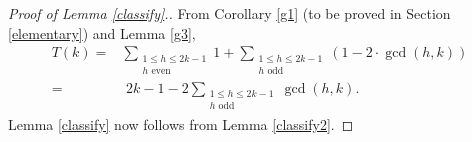 \documentclass[11pt,reqno]{amsart}
\theoremstyle{plain}
\numberwithin{equation}{section}
\begin{document}
\begin{proof}[Proof of Lemma \ref{classify}.] From Corollary \ref{g1} (to be proved in Section \ref{elementary}) and Lemma \ref{g3},
\begin{align*}
T(k) =&\sum\limits_{\substack{1\leq h \leq 2k - 1 \\ h \text{ even}}}  1 + \sum\limits_{\substack{1\leq h \leq 2k - 1 \\ h \text{ odd}}}(1 -2\cdot \gcd(h,k))\\
=&\,\, 2k-1 - 2\sum\limits_{\substack{1\leq h \leq 2k - 1 \\ h \text{ odd}}}  \gcd(h,k).
\end{align*}
Lemma \ref{classify} now follows from Lemma \ref{classify2}.
\end{proof}
\end{document}
